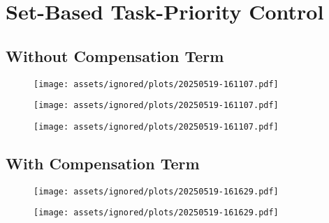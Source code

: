 \FloatBarrier

\section{Set-Based Task-Priority Control}





\subsection{Without Compensation Term}

\begin{figure}[!ht]
    \centering
    \texttt{[image: assets/ignored/plots/20250519-161107.pdf]}
    \caption{}
    \label{fig:results:tpc:bend:1:pos}
\end{figure}

\begin{figure}[!ht]
    \centering
    \texttt{[image: assets/ignored/plots/20250519-161107.pdf]}
    \caption{}
    \label{fig:results:tpc:bend:1:pos}
\end{figure}

\begin{figure}[!ht]
    \centering
    \texttt{[image: assets/ignored/plots/20250519-161107.pdf]}
    \caption{}
    \label{fig:results:tpc:bend:1:pos}
\end{figure}



\FloatBarrier


\subsection{With Compensation Term}

\begin{figure}[!ht]
    \centering
    \texttt{[image: assets/ignored/plots/20250519-161629.pdf]}
    \caption{}
    \label{fig:results:tpc:bend:1:pos}
\end{figure}

\begin{figure}[!ht]
    \centering
    \texttt{[image: assets/ignored/plots/20250519-161629.pdf]}
    \caption{}
    \label{fig:results:tpc:bend:1:pos}
\end{figure}

